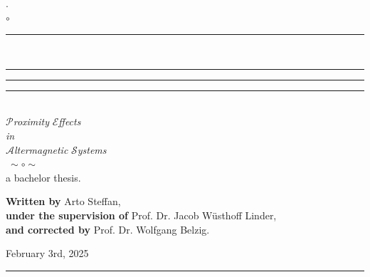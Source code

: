 \documentclass[twoside,a4paper]{article}
\begin{document}

\newcommand{\rem}[1]{\textcolor{TamGreen}{#1}}
\thispagestyle{empty}
%  
\thispagestyle{empty}
\begin{center} 
    \noindent\Huge.\\
    \noindent$\circ$\\
    \rule{0.1\textwidth}{0.75pt}\\
    \rule[20pt]{0.17\textwidth}{0.75pt} \rule[20pt]{0.5\textwidth}{0.75pt} \rule[20pt]{0.17\textwidth}{0.75pt}\\
    \vspace*{30pt}
    \Huge $\mathcal{P}$\textit{roximity} $\mathcal{E}$\textit{ffects}\\
     \textit{in}\\ 
    $\mathcal{A}$\textit{ltermagnetic}  $\mathcal{S}$\textit{ystems}
    \vspace*{12pt}\\
    $~\sim\circ\sim~$
    \vspace*{48pt}\\
    \normalsize
 a bachelor thesis.\\

\end{center}
\vspace*{60pt}
\noindent
\normalsize
\textbf{Written by} Arto Steffan, \\
\textbf{under the supervision of} Prof. Dr. Jacob Wüsthoff Linder, \\
\textbf{and corrected by} Prof. Dr. Wolfgang Belzig.\\
\vspace*{112pt}
\begin{center}
    February 3rd, 2025
\end{center}
\vspace*{12pt}
\begin{center}
    \rule{.4\textwidth}{0.4pt}
\end{center}
\vspace*{12pt}
\end{document}
